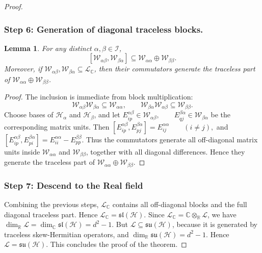 \documentclass[10pt,twocolumn,superscriptaddress,aps,amsmath,amssymb,citeautoscript,floatfix,prx]{revtex4-2}
\theoremstyle{plain}
\theoremstyle{plain}
\theoremstyle{plain}
\theoremstyle{plain}
\theoremstyle{plain}
\theoremstyle{plain}
\newcommand{\C}{\mathbb{C}}
\newcommand{\R}{\mathbb{R}}
\newcommand{\su}{\mathfrak{su}}
\newcommand{\HH}{\mathcal{H}}
\theoremstyle{plain}
\newtheorem{smlemma}[smtheorem]{Lemma}
\theoremstyle{definition}
\theoremstyle{plain}
\begin{document}
\begin{appendix}
\begin{proof}
\subsubsection*{Step 6: Generation of diagonal traceless blocks.}


\begin{smlemma}\label{lem:diag_blocks}
For any distinct \(\alpha,\beta\in\mathcal I\),
\[
[\mathcal W_{\alpha\beta},\mathcal W_{\beta\alpha}]
\subseteq
\mathcal W_{\alpha\alpha}\oplus \mathcal W_{\beta\beta}.
\]
Moreover, if \(\mathcal W_{\alpha\beta},\mathcal W_{\beta\alpha}\subseteq \mathcal L_\C\), then
their commutators generate the traceless part of
\(\mathcal W_{\alpha\alpha}\oplus \mathcal W_{\beta\beta}\).
\end{smlemma}

\begin{proof}
The inclusion is immediate from block multiplication:
\[
\mathcal W_{\alpha\beta}\mathcal W_{\beta\alpha}\subseteq \mathcal W_{\alpha\alpha},
\qquad
\mathcal W_{\beta\alpha}\mathcal W_{\alpha\beta}\subseteq \mathcal W_{\beta\beta}.
\]
Choose bases of \(\HH_\alpha\) and \(\HH_\beta\), and let
$
E^{\alpha\beta}_{ip}\in \mathcal W_{\alpha\beta},
\qquad
E^{\beta\alpha}_{qj}\in \mathcal W_{\beta\alpha}
$
be the corresponding matrix units. Then
$
[E^{\alpha\beta}_{ip},E^{\beta\alpha}_{pj}]
=
E^{\alpha\alpha}_{ij}
\qquad (i\neq j),
$
and
$
[E^{\alpha\beta}_{ip},E^{\beta\alpha}_{pi}]
=
E^{\alpha\alpha}_{ii}-E^{\beta\beta}_{pp}.
$
Thus the commutators generate all off-diagonal matrix units inside
\(\mathcal W_{\alpha\alpha}\) and \(\mathcal W_{\beta\beta}\), together with all diagonal differences. Hence they generate the traceless part of
\(\mathcal W_{\alpha\alpha}\oplus \mathcal W_{\beta\beta}\).
\end{proof}

\subsubsection*{Step 7: Descend to the Real field}

Combining the previous steps, \(\mathcal L_\C\) contains all off-diagonal blocks and the full diagonal traceless part. Hence
$
\mathcal L_\C=\mathfrak{sl}(\HH).
$ 
Since $\mathcal L_\C = \mathbb{C}\otimes_\R \mathcal L$, we have
$
\dim_\R \mathcal L=\dim_\C \mathfrak{sl}(\HH)=d^2-1.
$
But \(\mathcal L\subseteq \su(\HH)\), because it is generated by traceless skew-Hermitian operators, and
$
\dim_\R \su(\HH)=d^2-1.
$
Hence
$
\mathcal L=\su(\HH).
$
This concludes the proof of the theorem.
\end{proof}


\end{appendix}
\end{document}
